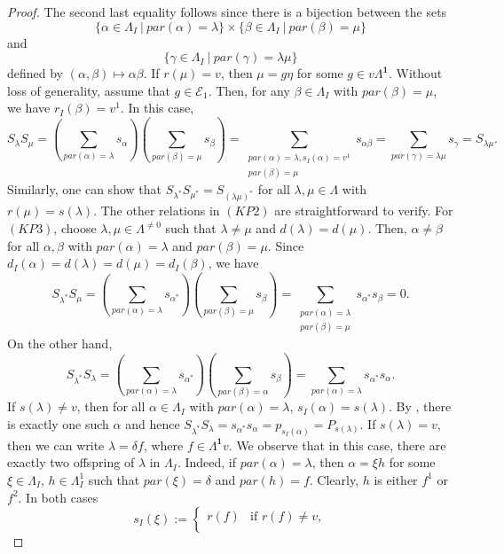 \documentclass[12pt]{amsart}
\theoremstyle{definition}
\theoremstyle{remark}
\begin{document}
\begin{proof}
The second last equality follows since there is a bijection between the sets \[\{\alpha\in \Lambda_I~|~par(\alpha)=\lambda\}\times \{\beta\in \Lambda_I~|~par(\beta)=\mu\}\] and \[\{\gamma\in \Lambda_I~|~par(\gamma)=\lambda\mu\}\] defined by $(\alpha,\beta)\longmapsto \alpha\beta$. If $r(\mu)=v$, then $\mu=g\eta$ for some $g\in v\Lambda^\mathbf{1}$. Without loss of generality, assume that $g\in \mathcal{E}_1$. Then, for any $\beta\in \Lambda_I$ with $par(\beta)=\mu$, we have $r_I(\beta)=v^1$. In this case, \[S_\lambda S_\mu=\left(\displaystyle{\sum_{par(\alpha)=\lambda}} s_\alpha\right)\left(\displaystyle{\sum_{par(\beta)=\mu}} s_\beta\right)=\displaystyle{\sum_{\substack{par(\alpha)=\lambda,s_I(\alpha)=v^1\\par(\beta)=\mu}}} s_{\alpha\beta}=\displaystyle{\sum_{par(\gamma)=\lambda\mu}} s_\gamma=S_{\lambda\mu}.\] Similarly, one can show that $S_{\lambda^*}S_{\mu^*}=S_{(\lambda\mu)^*}$ for all $\lambda,\mu\in \Lambda$ with $r(\mu)=s(\lambda)$. The other relations in $(KP2)$ are straightforward to verify. For $(KP3)$, choose $\lambda,\mu\in \Lambda^{\neq 0}$ such that $\lambda\neq \mu$ and $d(\lambda)=d(\mu)$. Then, $\alpha\neq \beta$ for all $\alpha,\beta$ with $par(\alpha)=\lambda$ and $par(\beta)=\mu$. Since $d_I(\alpha)=d(\lambda)=d(\mu)=d_I(\beta)$, we have \[S_{\lambda^*}S_\mu=\left(\displaystyle{\sum_{par(\alpha)=\lambda}} s_{\alpha^*}\right)\left(\displaystyle{\sum_{par(\beta)=\mu}} s_\beta\right)=\displaystyle{\sum_{\substack{par(\alpha)=\lambda\\par(\beta)=\mu}}} s_{\alpha^*}s_\beta=0.\] On the other hand, \[S_{\lambda^*}S_\lambda=\left(\displaystyle{\sum_{par(\alpha)=\lambda}} s_{\alpha^*}\right)\left(\displaystyle{\sum_{par(\beta)=\alpha}} s_\beta\right)=\displaystyle{\sum_{par(\alpha)=\lambda}} s_{\alpha^*}s_\alpha.\] If $s(\lambda)\neq v$, then for all $\alpha\in \Lambda_I$ with $par(\alpha)=\lambda$, $s_I(\alpha)=s(\lambda)$. By \cite[Remark 3.7]{EFGGGP}, there is exactly one such $\alpha$ and hence $S_{\lambda^*}S_\lambda=s_{\alpha^*}s_\alpha=p_{s_I(\alpha)}=P_{s(\lambda)}$. If $s(\lambda)=v$, then we can write $\lambda=\delta f$, where $f\in \Lambda^\mathbf{1} v$. We observe that in this case, there are exactly two offspring of $\lambda$ in $\Lambda_I$. Indeed, if $par(\alpha)=\lambda$, then $\alpha=\xi h$ for some $\xi\in \Lambda_I$, $h\in \Lambda_I^1$ such that $par(\xi)=\delta$ and $par(h)=f$. Clearly, $h$ is either $f^1$ or $f^2$. In both cases 
$$s_I(\xi):=
	\left\{
	\begin{array}{lll}
		r(f) & \mbox{if } r(f)\neq v, \\

\end{array}$$
\end{proof}
\end{document}
